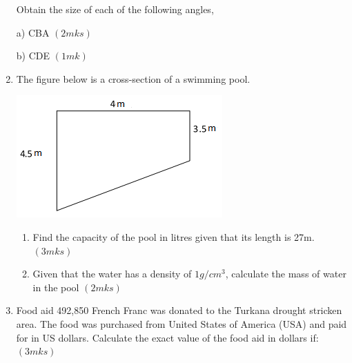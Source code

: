 \documentclass[
  a4paperpaper,
]{scrbook}
\begin{document}
\begin{tcolorbox}
\begin{enumerate}
  Obtain the size of each of the following angles,

  a) CBA \((2mks)\)

  b) CDE \((1mk)\)
\item
  The figure below is a cross-section of a swimming pool.

  \includegraphics{figures/fig2.png}

  \begin{enumerate}
  \def\labelenumii{\alph{enumii})}
  \item
    Find the capacity of the pool in litres given that its length is
    27m. \((3mks)\)
  \item
    Given that the water has a density of \(1g/cm^3\), calculate the
    mass of water in the pool \((2mks)\)
  \end{enumerate}
\item
  Food aid 492,850 French Franc was donated to the Turkana drought
  stricken area. The food was purchased from United States of America
  (USA) and paid for in US dollars. Calculate the exact value of the
  food aid in dollars if: \((3mks)\)


\end{enumerate}
\end{tcolorbox}
\end{document}
